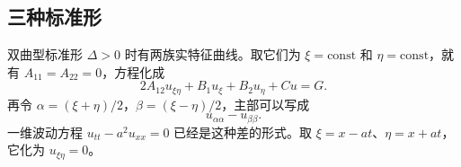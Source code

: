 \documentclass[fontset=windows, chinese, 10pt, xcolor=dvipsnames]{beamer}
\begin{document}

\subsection{三种标准形}

\begin{frame}{双曲型标准形}
  $\Delta>0$ 时有两族实特征曲线。取它们为 $\xi=\mathrm{const}$ 和 $\eta=\mathrm{const}$，就有 $A_{11}=A_{22}=0$，方程化成
  \begin{equation*}
    2A_{12}u_{\xi\eta}+B_1u_\xi+B_2u_\eta+Cu=G.
  \end{equation*}
  再令 $\alpha=(\xi+\eta)/2$，$\beta=(\xi-\eta)/2$，主部可以写成
  \begin{equation*}
    u_{\alpha\alpha}-u_{\beta\beta}.
  \end{equation*}
  一维波动方程 $u_{tt}-a^2u_{xx}=0$ 已经是这种差的形式。取 $\xi=x-at$、$\eta=x+at$，它化为 $u_{\xi\eta}=0$。
\end{frame}
\end{document}
